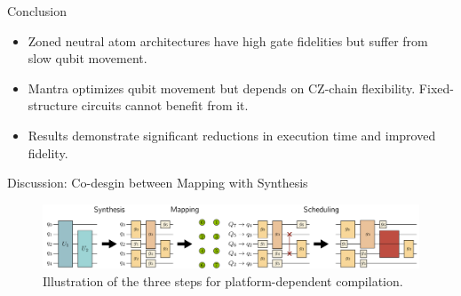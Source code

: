 \documentclass{beamer}
\begin{document}
	
	\begin{frame}{Conclusion}
		\begin{itemize}
			\item Zoned neutral atom architectures have high gate fidelities but suffer from slow qubit movement.
			\item Mantra optimizes qubit movement but depends on CZ-chain flexibility. Fixed-structure circuits cannot benefit from it.
			\item Results demonstrate significant reductions in execution time and improved fidelity.
		\end{itemize}
	\end{frame}
	
	\begin{frame}{Discussion: Co-desgin between Mapping with Synthesis}
		\begin{figure}
			\centering
			\includegraphics[width=.9\textwidth]{figure/dis.png}
			\caption[]{Illustration of the three steps for platform-dependent compilation.}
		\end{figure}
	\end{frame}
\end{document}
